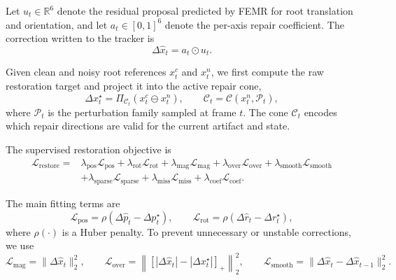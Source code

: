 \documentclass{article}
\begin{document}
	Let $u_t\in\mathbb{R}^{6}$ denote the residual proposal predicted by FEMR for root translation and orientation, and let $a_t\in[0,1]^6$ denote the per-axis repair coefficient. The correction written to the tracker is
	\begin{equation}
	\label{eq:written-correction}
	\Delta \hat{x}_t = a_t \odot u_t .
	\end{equation}

	Given clean and noisy root references $x_t^{c}$ and $x_t^{n}$, we first compute the raw restoration target and project it into the active repair cone,
	\begin{equation}
	\label{eq:cone-target}
	\Delta x_t^\star
	=
	\Pi_{\mathcal{C}_t}
	\left(
	x_t^{c}\ominus x_t^{n}
	\right),
	\qquad
	\mathcal{C}_t
	=
	\mathcal{C}
	\left(
	x_t^{n}, \mathcal{P}_t
	\right),
	\end{equation}
	where $\mathcal{P}_t$ is the perturbation family sampled at frame $t$. The cone $\mathcal{C}_t$ encodes which repair directions are valid for the current artifact and state.

	The supervised restoration objective is
	\begin{equation}
	\label{eq:supervised-restoration-loss}
	\begin{split}
	\mathcal{L}_{\mathrm{restore}}
	=
	&\lambda_{\mathrm{pos}}\mathcal{L}_{\mathrm{pos}}
	+\lambda_{\mathrm{rot}}\mathcal{L}_{\mathrm{rot}}
	+\lambda_{\mathrm{mag}}\mathcal{L}_{\mathrm{mag}}
	+\lambda_{\mathrm{over}}\mathcal{L}_{\mathrm{over}}
	+\lambda_{\mathrm{smooth}}\mathcal{L}_{\mathrm{smooth}} \\
	&+\lambda_{\mathrm{sparse}}\mathcal{L}_{\mathrm{sparse}}
	+\lambda_{\mathrm{miss}}\mathcal{L}_{\mathrm{miss}}
	+\lambda_{\mathrm{coef}}\mathcal{L}_{\mathrm{coef}} .
	\end{split}
	\end{equation}

	The main fitting terms are
	\begin{equation}
	\label{eq:fitting-loss}
	\mathcal{L}_{\mathrm{pos}}
	=
	\rho
	\left(
	\Delta \hat{p}_t-\Delta p_t^\star
	\right),
	\qquad
	\mathcal{L}_{\mathrm{rot}}
	=
	\rho
	\left(
	\Delta \hat{r}_t-\Delta r_t^\star
	\right),
	\end{equation}
	where $\rho(\cdot)$ is a Huber penalty. To prevent unnecessary or unstable corrections, we use
	\begin{equation}
	\label{eq:regularization-loss}
	\mathcal{L}_{\mathrm{mag}}
	=
	\|\Delta \hat{x}_t\|_2^2,
	\qquad
	\mathcal{L}_{\mathrm{over}}
	=
	\left\|
	\left[
	|\Delta \hat{x}_t|-|\Delta x_t^\star|
	\right]_+
	\right\|_2^2,
	\qquad
	\mathcal{L}_{\mathrm{smooth}}
	=
	\|\Delta \hat{x}_t-\Delta \hat{x}_{t-1}\|_2^2 .
	\end{equation}
\end{document}
